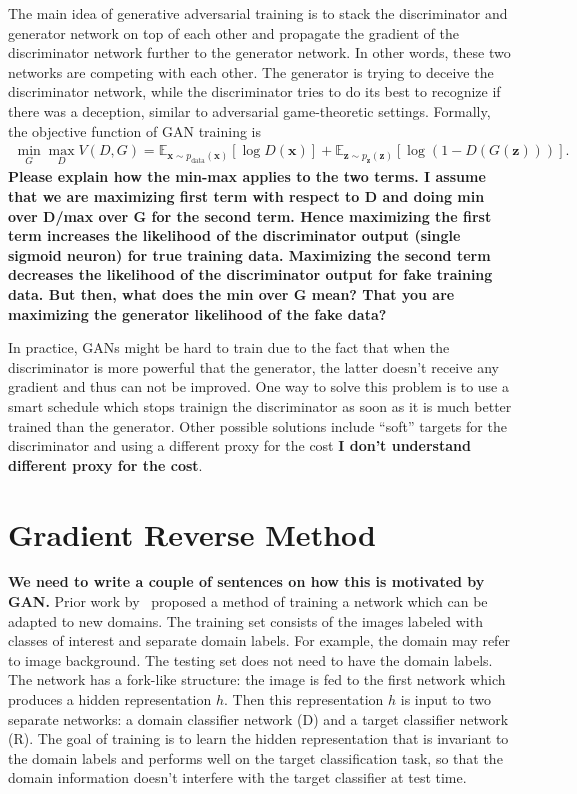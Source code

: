 \documentclass{article}
\begin{document}
    The main idea of generative adversarial
    training is to stack the discriminator and generator network on top of each other and propagate the gradient of the discriminator
    network further to the generator network. In other words, these two networks are competing with each other. The 
    generator is trying to deceive the discriminator network, while the discriminator tries
    to do its best to recognize if there was a deception, similar to adversarial game-theoretic settings.    
    Formally, the objective function of GAN training is
    \begin{align*}
        \min_G \max_D V(D, G) = \mathbb{E}_{\bm{x} \sim p_{\text{data}}(\bm{x})}[\log D(\bm{x})] + 
            \mathbb{E}_{\bm{z} \sim p_{\bm{z}}(\bm{z})}[\log (1 - D(G(\bm{z})))].
    \end{align*}
	{\bf Please explain how the min-max applies to the two terms. I assume that we are maximizing first term with respect to D and doing min over D/max over G for the second term. Hence maximizing the first term increases the likelihood of the discriminator output (single sigmoid neuron) for true training data. Maximizing the second term decreases the likelihood of the discriminator output for fake training data. But then, what does the min over G mean? That you are maximizing the generator likelihood of the fake data?}
  
    In practice, GANs might be hard to train due to the fact that when 
    the discriminator is more powerful that the generator, the latter doesn't 
    receive any gradient and thus can not be improved. One way to solve this problem is to
    use a smart schedule which stops trainign the discriminator as soon as it
    is much better trained than the generator. Other possible solutions include ``soft''
    targets for the discriminator and using a 
    different proxy for the cost {\bf I don't understand different proxy for the cost}.

\section{Gradient Reverse Method}
\label{sec:gradient-reverse}

    {\bf We need to write a couple of sentences on how this is motivated by GAN.} Prior work by~\cite{ganin2014unsupervised} proposed a method of training a network 
    which can be adapted to new domains. The training set consists of the images
    labeled with classes of interest and separate domain labels. For example, the domain may refer to image background. The testing set does not need
    to have the domain labels. The network has a fork-like structure: the image is fed to the
    first network which produces a hidden representation $h$. Then this representation $h$ is input to two separate networks: a domain classifier network (D) and 
    a target classifier network (R). The goal of training is to learn the hidden 
    representation that is invariant to the domain labels and performs well on the target classification task, so that the domain information doesn't 
    interfere with the target classifier at test time.
\end{document}
